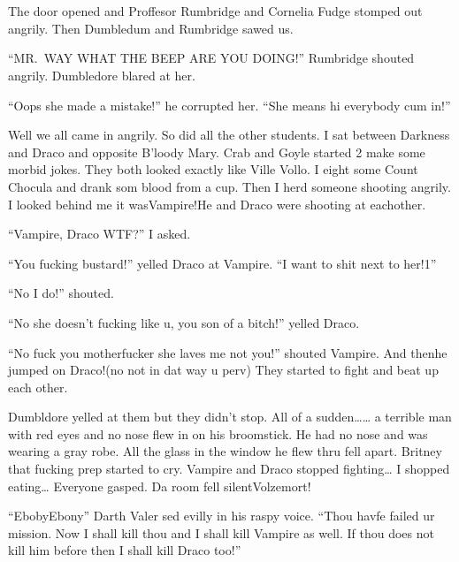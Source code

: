 \section{}



The door opened and Proffesor Rumbridge and Cornelia Fudge stomped out angrily. Then Dumbledum and Rumbridge sawed us.

\enquote{MR.~WAY WHAT THE BEEP ARE YOU DOING\@!} Rumbridge shouted angrily. Dumbledore blared at her.

\enquote{Oops she made a mistake!} he corrupted her. \enquote{She means hi everybody cum in!}

Well we all came in angrily. So did all the other students. I sat between Darkness and Draco and opposite B'loody Mary. Crab and Goyle started 2 make some morbid jokes. They both looked exactly like Ville Vollo. I eight some Count Chocula and drank som blood from a cup. Then I herd someone shooting angrily. I looked behind me it was\dotfill Vampire!\newline He and Draco were shooting at eachother.

\enquote{Vampire, Draco WTF?} I asked.

\enquote{You fucking bustard!} yelled Draco at Vampire. \enquote{I want to shit next to her!1}

\enquote{No I do!} shouted.

\enquote{No she doesn't fucking like u, you son of a bitch!} yelled Draco.

\enquote{No fuck you motherfucker she laves me not you!} shouted Vampire. And then\dotfill he jumped on Draco!\newline (no not in dat way u perv) They started to fight and beat up each other.

Dumbldore yelled at them but they didn't stop. All of a sudden\ldots{}\ldots{} a terrible man with red eyes and no nose flew in on his broomstick. He had no nose and was wearing a gray robe. All the glass in the window he flew thru fell apart. Britney that fucking prep started to cry. Vampire and Draco stopped fighting\ldots{} I shopped eating\ldots{} Everyone gasped. Da room fell silent\dotfill\newline\phantom{}\dotfill Volzemort!

\enquote{Eboby\dotfill Ebony\dotfill} Darth Valer sed evilly in his raspy voice. \enquote{Thou havfe failed ur mission. Now I shall kill thou and I shall kill Vampire as well. If thou does not kill him before then I shall kill Draco too!}


